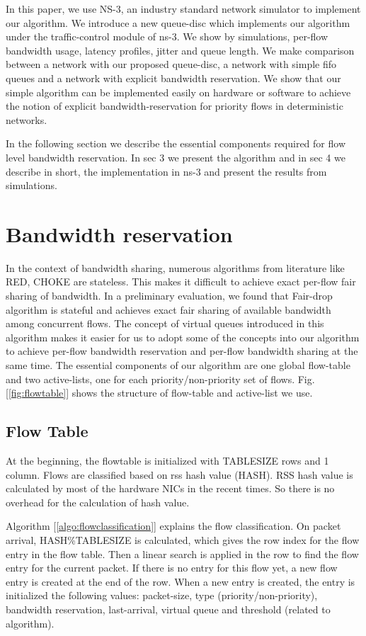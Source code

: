 \documentclass[conference]{IEEEtran}
\begin{document}
In this paper, we use NS-3, an industry standard network simulator to implement our algorithm. We introduce a new queue-disc which implements our algorithm under the traffic-control module of ns-3. We show by simulations, per-flow bandwidth usage, latency profiles, jitter and queue length. We make comparison between a network with our proposed queue-disc, a network with simple fifo queues and a network with explicit bandwidth reservation. We show that our simple algorithm can be implemented easily on hardware or software to achieve the notion of explicit bandwidth-reservation for priority flows in deterministic networks.

In the following section we describe the essential components required for flow level bandwidth reservation. In sec 3 we present the algorithm and in sec 4 we describe in short, the implementation in ns-3 and present the results from simulations.

\section{Bandwidth reservation}

In the context of bandwidth sharing, numerous algorithms from literature like RED, CHOKE are stateless. This makes it difficult to achieve exact per-flow fair sharing of bandwidth. In a preliminary evaluation, we found that Fair-drop algorithm \cite{c} is stateful and achieves exact fair sharing of available bandwidth among concurrent flows. The concept of virtual queues introduced in this algorithm makes it easier for us to adopt some of the concepts into our algorithm to achieve per-flow bandwidth reservation and per-flow bandwidth sharing at the same time. The essential components of our algorithm are one global flow-table and two active-lists, one for each priority/non-priority set of flows. Fig. [\ref{fig:flowtable}] shows the structure of flow-table and active-list we use.

\subsection{Flow Table}
At the beginning, the flowtable is initialized with TABLESIZE rows and 1 column. Flows are classified based on rss hash value (HASH). RSS hash value is calculated by most of the hardware NICs in the recent times. So there is no overhead for the calculation of hash value. 

Algorithm [\ref{algo:flowclassification}] explains the flow classification. On packet arrival, HASH\%TABLESIZE is calculated, which gives the row index for the flow entry in the flow table. Then a linear search is applied in the row to find the flow entry for the current packet. If there is no entry for this flow yet, a new flow entry is created at the end of the row.
When a new entry is created, the entry is initialized the following values: packet-size, type (priority/non-priority), bandwidth reservation, last-arrival, virtual queue and threshold (related to algorithm).
\end{document}

